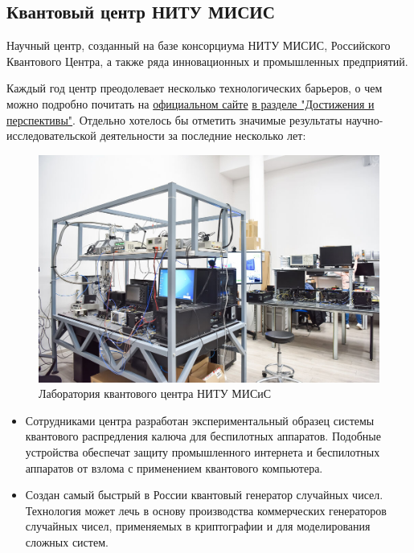 \subsection{Квантовый центр НИТУ МИСИС}

Научный центр, созданный на базе консорциума НИТУ МИСИС, Российского Квантового Центра, а также ряда инновационных и промышленных предприятий.

Каждый год центр преодолевает несколько технологических барьеров, о чем можно подробно почитать на \href{https://misis.ru/university/struktura-universiteta/centre/90/}{официальном сайте} \href{https://misis.ru/university/struktura-universiteta/centre/90/achievements/}{в разделе "Достижения и перспективы"}.
Отдельно хотелось бы отметить значимые результаты научно-исследовательской деятельности за последние несколько лет:

\begin{figure}[h!]
    \centering
    \includegraphics[width=1.0\linewidth]{pics/missis_quantum_centre.jpg}
    \caption{Лаборатория квантового центра НИТУ МИСиС}
    \label{missis_lab}
\end{figure}


\begin{itemize}
    \item Сотрудниками центра разработан экспериментальный образец системы квантового распредления калюча для беспилотных аппаратов. Подобные устройства обеспечат защиту промышленного интернета и беспилотных аппаратов от взлома с применением квантового компьютера.

    \item Создан самый быстрый в России квантовый генератор случайных чисел. Технология может лечь в основу производства коммерческих генераторов случайных чисел, применяемых в криптографии и для моделирования сложных систем.
\end{itemize}

